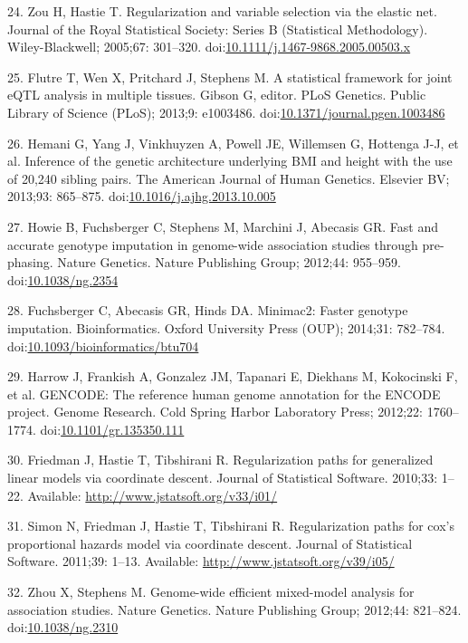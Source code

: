 \documentclass[]{article}
\begin{document}
24. Zou H, Hastie T. Regularization and variable selection via the
elastic net. Journal of the Royal Statistical Society: Series B
(Statistical Methodology). Wiley-Blackwell; 2005;67: 301--320.
doi:\href{http://dx.doi.org/10.1111/j.1467-9868.2005.00503.x}{10.1111/j.1467-9868.2005.00503.x}

25. Flutre T, Wen X, Pritchard J, Stephens M. A statistical framework
for joint eQTL analysis in multiple tissues. Gibson G, editor. PLoS
Genetics. Public Library of Science (PLoS); 2013;9: e1003486.
doi:\href{http://dx.doi.org/10.1371/journal.pgen.1003486}{10.1371/journal.pgen.1003486}

26. Hemani G, Yang J, Vinkhuyzen A, Powell JE, Willemsen G, Hottenga
J-J, et al. Inference of the genetic architecture underlying BMI and
height with the use of 20,240 sibling pairs. The American Journal of
Human Genetics. Elsevier BV; 2013;93: 865--875.
doi:\href{http://dx.doi.org/10.1016/j.ajhg.2013.10.005}{10.1016/j.ajhg.2013.10.005}

27. Howie B, Fuchsberger C, Stephens M, Marchini J, Abecasis GR. Fast
and accurate genotype imputation in genome-wide association studies
through pre-phasing. Nature Genetics. Nature Publishing Group; 2012;44:
955--959. doi:\href{http://dx.doi.org/10.1038/ng.2354}{10.1038/ng.2354}

28. Fuchsberger C, Abecasis GR, Hinds DA. Minimac2: Faster genotype
imputation. Bioinformatics. Oxford University Press (OUP); 2014;31:
782--784.
doi:\href{http://dx.doi.org/10.1093/bioinformatics/btu704}{10.1093/bioinformatics/btu704}

29. Harrow J, Frankish A, Gonzalez JM, Tapanari E, Diekhans M,
Kokocinski F, et al. GENCODE: The reference human genome annotation for
the ENCODE project. Genome Research. Cold Spring Harbor Laboratory
Press; 2012;22: 1760--1774.
doi:\href{http://dx.doi.org/10.1101/gr.135350.111}{10.1101/gr.135350.111}

30. Friedman J, Hastie T, Tibshirani R. Regularization paths for
generalized linear models via coordinate descent. Journal of Statistical
Software. 2010;33: 1--22. Available:
\url{http://www.jstatsoft.org/v33/i01/}

31. Simon N, Friedman J, Hastie T, Tibshirani R. Regularization paths
for cox's proportional hazards model via coordinate descent. Journal of
Statistical Software. 2011;39: 1--13. Available:
\url{http://www.jstatsoft.org/v39/i05/}

32. Zhou X, Stephens M. Genome-wide efficient mixed-model analysis for
association studies. Nature Genetics. Nature Publishing Group; 2012;44:
821--824. doi:\href{http://dx.doi.org/10.1038/ng.2310}{10.1038/ng.2310}
\end{document}
